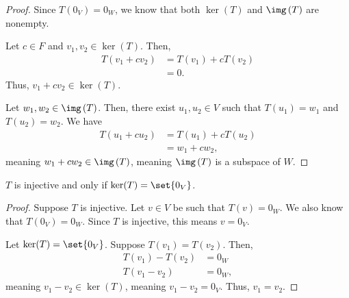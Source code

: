 \documentclass[10pt]{mypackage}
\begin{document}
\begin{proof}
  Since $T\left(0_V\right) = 0_W$, we know that both $\ker(T)$ and $\img\left(T\right)$ are nonempty.\newline

  Let $c\in F$ and $v_1,v_2\in \ker(T)$. Then,
  \begin{align*}
    T\left(v_1 + cv_2\right) &= T\left(v_1\right) + cT\left(v_2\right)\\
                             &= 0.
  \end{align*}
  Thus, $v_1 + cv_2 \in \ker(T)$.\newline

  Let $w_1,w_2\in \img\left(T\right)$. Then, there exist $u_1,u_2\in V$ such that $T\left(u_1\right) = w_1$ and $T\left(u_2\right) = w_2$. We have
  \begin{align*}
    T\left(u_1 + cu_2\right) &= T\left(u_1\right) + cT\left(u_2\right)\\
                             &= w_1 + cw_2,
  \end{align*}
  meaning $w_1 + cw_2\in \img\left(T\right)$, meaning $\img\left(T\right)$ is a subspace of $W$.
\end{proof}
\begin{lemma}
  $T$ is injective and only if $\ker(T) = \set{0_V}$.
\end{lemma}
\begin{proof}
  Suppose $T$ is injective. Let $v\in V$ be such that $T\left(v\right) = 0_W$. We also know that $T\left(0_V\right) = 0_W$. Since $T$ is injective, this means $v = 0_V$.\newline

  Let $\ker(T) = \set{0_V}$. Suppose $T\left(v_1\right) = T\left(v_2\right)$. Then,
  \begin{align*}
    T\left(v_1\right) - T\left(v_2\right) &= 0_W\\
    T\left(v_1 - v_2\right) &= 0_W,
  \end{align*}
  meaning $v_1 - v_2 \in \ker(T)$, meaning $v_1 - v_2 = 0_V$. Thus, $v_1 = v_2$.
\end{proof}
\end{document}
